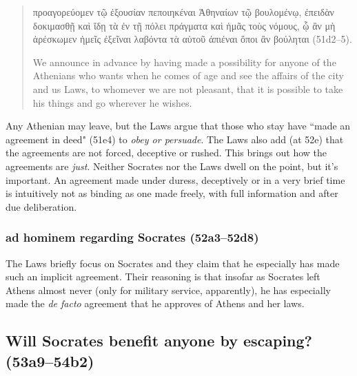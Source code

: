 \documentclass[12pt,letterpaper]{article}
\begin{document}
\begin{quote}

    \textgreek{προαγορεύομεν τῷ ἐξουσίαν πεποιηκέναι Ἀθηναίων τῷ βουλομένῳ, ἐπειδὰν δοκιμασθῇ καὶ ἴδῃ τὰ ἐν τῇ πόλει πράγματα καὶ ἡμᾶς τοὺς νόμους, ᾧ ἂν μὴ ἀρέσκωμεν ἡμεῖς ἐξεῖναι λαβόντα τὰ αὑτοῦ ἀπιέναι ὅποι ἂν βούληται} (51d2--5).

    We announce in advance by having made a possibility for anyone of the Athenians who wants when he comes of age and see the affairs of the city and us Laws, to whomever we are not pleasant, that it is possible to take his things and go wherever he wishes.

\end{quote}

Any Athenian may leave, but the Laws argue that those who stay have ``made an agreement in deed" (51e4) to \emph{obey or persuade}. The Laws also add (at 52e) that the agreements are not forced, deceptive or rushed. This brings out how the agreements are \emph{just}. Neither Socrates nor the Laws dwell on the point, but it's important. An agreement made under duress, deceptively or in a very brief time is intuitively not as binding as one made freely, with full information and after due deliberation.


\subsubsection*{ad hominem regarding Socrates (52a3--52d8)}

The Laws briefly focus on Socrates and they claim that he especially has made such an implicit agreement. Their reasoning is that insofar as Socrates left Athens almost never (only for military service, apparently), he has especially made the \textit{de facto} agreement that he approves of Athens and her laws.


\subsection*{Will Socrates benefit anyone by escaping? (53a9--54b2)}
\end{document}
